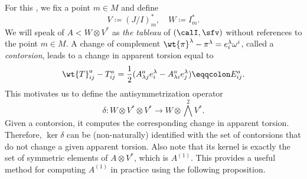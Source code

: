 For this \sect, we fix a point $m\in M$ and define 
\[V\coloneqq  (J\slash I)_m^\ast,\quad W\coloneqq I_m^\ast.\] 
We will speak of $A<W\otimes V^\ast$ as \emph{the tableau} of $(\calI,\sfv)$ without references to the point $m\in M$.
A change of complement $\wt{\pi}^\lambda-\pi^\lambda=e^\lambda_i \omega^i$, called a \emph{contorsion}, leads to a change in apparent torsion equal to
\[\wt{T}^a_{ij}-T^a_{ij}=\frac12(A^a_{\lambda j}e^\lambda_i-A^a_{\lambda i}e^\lambda_j)\eqqcolon E^a_{ij}.\]
This motivates us to define the antisymmetrization operator
\[\delta:W\otimes V^\ast\otimes V^\ast\to W\otimes \bigwedge^2V^\ast.\]
Given a contorsion, it computes the corresponding change in apparent torsion. Therefore, $\ker\delta$ can be (non-naturally) identified with the set of contorsions that do not change a given apparent torsion. Also note that its kernel is exactly the set of symmetric elements of $A\otimes V^\ast$, which is $A^{(1)}$. This provides a useful method for computing $A^{(1)}$ in practice using the following proposition.

